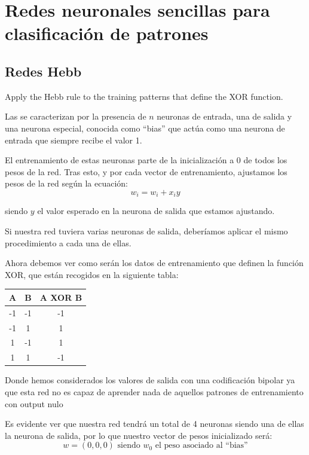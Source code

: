 \section{Redes neuronales sencillas para clasificación de patrones}
\subsection{Redes Hebb}

\begin{problem}[1]
Apply the Hebb rule to the training patterns that define the XOR function.
\solution

Las  se caracterizan por la presencia de $n$ neuronas de entrada, una de salida y una neurona especial, conocida como ``bias'' que actúa como una neurona de entrada que siempre recibe el valor 1.

El entrenamiento de estas neuronas parte de la inicialización a 0 de todos los pesos de la red. Tras esto, y por cada vector de entrenamiento, ajustamos los pesos de la red según la ecuación:
\begin{equation}\label{eq:hebbRule}
w_i=w_i+x_iy
\end{equation}

siendo $y$ el valor esperado en la neurona de salida que estamos ajustando.

Si nuestra red tuviera varias neuronas de salida, deberíamos aplicar el mismo procedimiento a cada una de ellas.

Ahora debemos ver como serán los datos de entrenamiento que definen la función XOR, que están recogidos en la siguiente tabla:
\begin{center}
\begin{tabular}{|c|c|c|}
\hline
\textbf{A} & \textbf{B} & \textbf{A XOR B} \\
\hline
-1 & -1 & -1 \\
-1 & 1 & 1 \\
1 & -1 & 1 \\
1 & 1 & -1 \\
\hline
\end{tabular}
\end{center}
Donde hemos considerados los valores de salida con una codificación bipolar ya que esta red no es capaz de aprender nada de aquellos patrones de entrenamiento con output nulo

Es evidente ver que nuestra red tendrá un total de 4 neuronas siendo una de ellas la neurona de salida, por lo que nuestro vector de pesos inicializado será:
\[w = (0,0,0) \text{ siendo } w_0 \text{ el peso asociado al ``bias''}\]


\end{problem}

